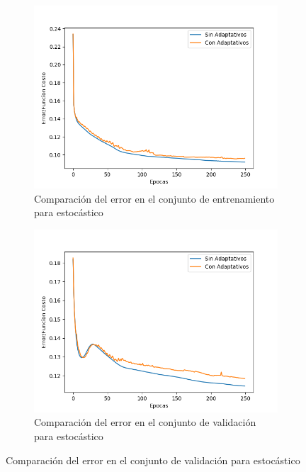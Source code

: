 \begin{figure}[!htbp]
\centering
\begin{subfigure}{.5\textwidth}
  \centering
  \includegraphics[width=1\linewidth]{graficos/ej2/adaptativos_promedios_entrenamiento_1.png}
  \caption{Comparación del error en el conjunto de entrenamiento para estocástico}
  \label{fig:sub1}
\end{subfigure}%
\begin{subfigure}{.5\textwidth}
  \centering
  \includegraphics[width=1\linewidth]{graficos/ej2/adaptativos_promedios_validacion_1.png}
  \caption{Comparación del error en el conjunto de validación para estocástico}
  \label{fig:sub2}
\end{subfigure}
\end{figure}

